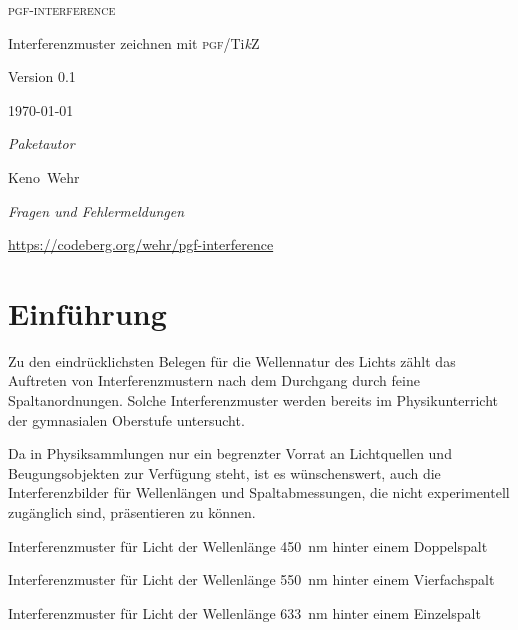 \documentclass{scrartcl}
\newcommand*\Paket[1]{\textsf{#1}}
\newcommand\inter{\textcolor{pgfinterferencered}{\Paket{pgf-interference}}}
\newcommand\pgftikz{\Paket{\textsc{pgf}/Ti\textit{k}Z}}
\newcommand\AutorNachname{Wehr}
\newcommand\AutorVorname{Keno}
\begin{document}
\begin{center}
\fontsize{41}{41}\selectfont\textsc{\inter}

\medskip
\pgfinterferencepattern{}

\LARGE
\rmfamily
Interferenzmuster zeichnen mit \pgftikz

\bigskip
\Large
\textcolor{pgfinterferencered}{Version 0.1}

\medskip
\large
\today

\bigskip
\textit{Paketautor}

\smallskip
\AutorVorname\ \AutorNachname

\bigskip
\textit{Fragen und Fehlermeldungen}

\smallskip
\normalsize
\url{https://codeberg.org/wehr/pgf-interference}
\end{center}

\begin{abstract}
\noindent Mit diesem \LaTeX-Paket können Interferenzmuster, die bei Beugung von monochromatischem Licht an regelmäßigen Spaltanordnungen auf einem Schirm entstehen, simuliert werden. Hierfür wird das Graphikpaket \pgftikz\ verwendet.

\medskip
\noindent Das Paket ist noch im experimentellen Stadium. Die Nutzerschnittstelle kann sich in künftigen Versionen ändern.

\medskip
\noindent
{} \foreignlanguage{UKenglish}{An English version of this manual is available in the file \texttt{pgf-interference-en.pdf}.}
\end{abstract}

\vfill
\tableofcontents

\newpage
\section{Einführung}
Zu den eindrücklichsten Belegen für die Wellennatur des Lichts zählt das Auftreten von Interferenzmustern nach dem Durchgang durch feine Spaltanordnungen. Solche Interferenzmuster werden bereits im Physikunterricht der gymnasialen Oberstufe untersucht.

Da in Physiksammlungen nur ein begrenzter Vorrat an Lichtquellen und Beugungsobjekten zur Verfügung steht, ist es wünschenswert, auch die Interferenzbilder für Wellenlängen und Spaltabmessungen, die nicht experimentell zugänglich sind, präsentieren zu können.
\begin{center}

\small
Interferenzmuster für Licht der Wellenlänge
\qty{450}{nm}
hinter einem Doppelspalt

\medskip
{}

\small
Interferenzmuster für Licht der Wellenlänge
\qty{550}{nm}
hinter einem Vierfachspalt

\medskip
{}

\small
Interferenzmuster für Licht der Wellenlänge
\qty{633}{nm}
hinter einem Einzelspalt
\end{center}
\end{document}
